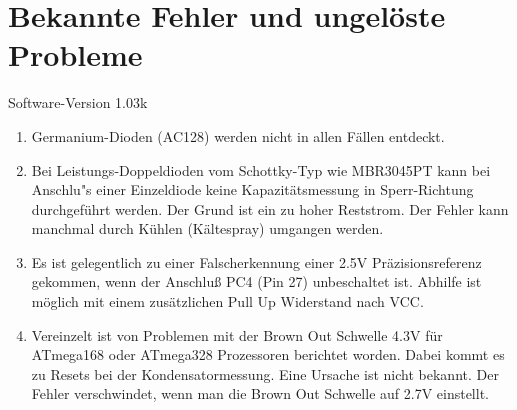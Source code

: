 
\chapter{Bekannte Fehler und ungelöste Probleme}
{\center Software-Version 1.03k}

\begin{enumerate}

\item Germanium-Dioden (AC128) werden nicht in allen Fällen entdeckt.
\item Bei Leistungs-Doppeldioden vom Schottky-Typ wie MBR3045PT kann bei Anschlu"s einer Einzeldiode keine Kapazitätsmessung in Sperr-Richtung 
durchgeführt werden. Der Grund ist ein zu hoher Reststrom. Der Fehler kann manchmal durch Kühlen (Kältespray) umgangen werden.
\item Es ist gelegentlich zu einer Falscherkennung einer 2.5V Präzisionsreferenz gekommen, wenn der Anschluß PC4 (Pin 27) unbeschaltet ist.
Abhilfe ist möglich mit einem zusätzlichen Pull Up Widerstand nach VCC.
\item Vereinzelt ist von Problemen mit der Brown Out Schwelle 4.3V für ATmega168 oder ATmega328 Prozessoren berichtet worden.
Dabei kommt es zu Resets bei der Kondensatormessung.  Eine Ursache ist nicht bekannt.
Der Fehler verschwindet, wenn man die Brown Out Schwelle auf 2.7V einstellt. 

\end{enumerate}
